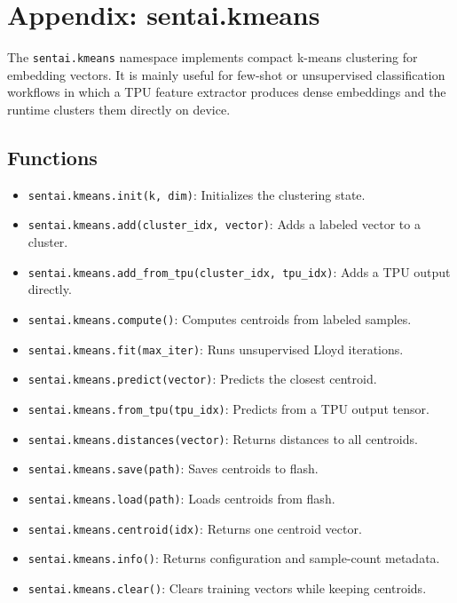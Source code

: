 \section{Appendix: sentai.kmeans}\label{appendix-sentai.kmeans}

The \texttt{sentai.kmeans} namespace implements compact k-means
clustering for embedding vectors. It is mainly useful for few-shot or
unsupervised classification workflows in which a TPU feature extractor
produces dense embeddings and the runtime clusters them directly on
device.

\subsection{Functions}\label{functions-16}

\begin{itemize}
\tightlist
\item
  \texttt{sentai.kmeans.init(k,\ dim)}: Initializes the clustering
  state.
\item
  \texttt{sentai.kmeans.add(cluster\_idx,\ vector)}: Adds a labeled
  vector to a cluster.
\item
  \texttt{sentai.kmeans.add\_from\_tpu(cluster\_idx,\ tpu\_idx)}: Adds a
  TPU output directly.
\item
  \texttt{sentai.kmeans.compute()}: Computes centroids from labeled
  samples.
\item
  \texttt{sentai.kmeans.fit(max\_iter)}: Runs unsupervised Lloyd
  iterations.
\item
  \texttt{sentai.kmeans.predict(vector)}: Predicts the closest centroid.
\item
  \texttt{sentai.kmeans.from\_tpu(tpu\_idx)}: Predicts from a TPU output
  tensor.
\item
  \texttt{sentai.kmeans.distances(vector)}: Returns distances to all
  centroids.
\item
  \texttt{sentai.kmeans.save(path)}: Saves centroids to flash.
\item
  \texttt{sentai.kmeans.load(path)}: Loads centroids from flash.
\item
  \texttt{sentai.kmeans.centroid(idx)}: Returns one centroid vector.
\item
  \texttt{sentai.kmeans.info()}: Returns configuration and sample-count
  metadata.
\item
  \texttt{sentai.kmeans.clear()}: Clears training vectors while keeping
  centroids.
\end{itemize}

